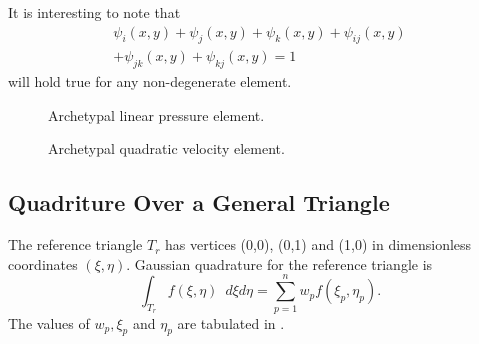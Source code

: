 \documentclass[wrr]{agutex}  %
\begin{document}
\begin{article}
It is interesting to note that
\begin{multline}
  \psi_i(x,y) + \psi_j(x,y) + \psi_k(x,y) + \psi_{ij}(x,y) 
  \\+ \psi_{jk}(x,y) + \psi_{kj}(x,y) = 1
\end{multline}
will hold true for any non-degenerate element.

\begin{figure}[h]
\caption{Archetypal linear pressure element.}\label{fig:tri}
\end{figure}


\begin{figure}[h]
\caption{Archetypal quadratic velocity element.}\label{fig:tri2}
\end{figure}

\subsection{Quadriture Over a General Triangle}
The reference triangle $T_r$ has vertices (0,0), (0,1) and (1,0) in dimensionless coordinates $(\xi,\eta)$. Gaussian quadrature for the reference triangle is 
\begin{equation}
  \int_{T_r}f(\xi,\eta)\,\,\,d\xi d\eta=\sum_{p=1}^{n}w_pf(\xi_p,\eta_p).
\end{equation}
The values of $w_p,\xi_p$ and $\eta_p$ are tabulated in \cite{Lapidus1982}.  


\end{article}
\end{document}
